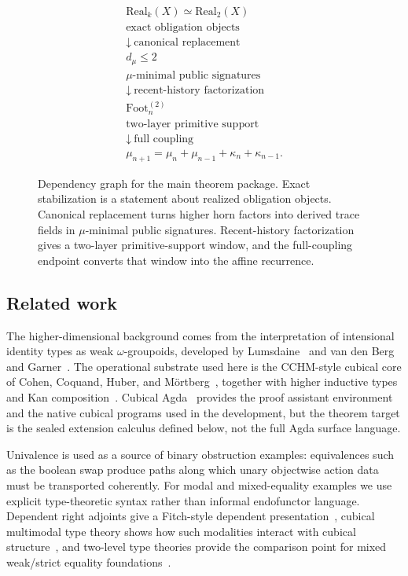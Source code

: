 \documentclass{lmcs}
\newcommand{\Real}{\mathrm{Real}}
\newcommand{\Foot}{\mathrm{Foot}}
\begin{document}
\begin{figure}[t]
\centering
\[
\begin{array}{c}
\Real_k(X)\simeq\Real_2(X)
\\
\text{exact obligation objects}
\\[0.8ex]
\downarrow\ \text{canonical replacement}
\\[0.8ex]
d_\mu\leq 2
\\
\mu\text{-minimal public signatures}
\\[0.8ex]
\downarrow\ \text{recent-history factorization}
\\[0.8ex]
\Foot_n^{(2)}
\\
\text{two-layer primitive support}
\\[0.8ex]
\downarrow\ \text{full coupling}
\\[0.8ex]
\mu_{n+1}=\mu_n+\mu_{n-1}+\kappa_n+\kappa_{n-1}.
\end{array}
\]
\caption{Dependency graph for the main theorem package. Exact stabilization is a statement about realized obligation objects. Canonical replacement turns higher horn factors into derived trace fields in $\mu$-minimal public signatures. Recent-history factorization gives a two-layer primitive-support window, and the full-coupling endpoint converts that window into the affine recurrence.}
\label{fig:dependency-graph}
\end{figure}

\subsection{Related work}
\label{sec:related}

The higher-dimensional background comes from the interpretation of intensional
identity types as weak $\omega$-groupoids, developed by Lumsdaine~\cite{lumsdaine}
and van den Berg and Garner~\cite{vdberg-garner}. The operational substrate used
here is the CCHM-style cubical core of Cohen, Coquand, Huber, and
M\"ortberg~\cite{cubical}, together with higher inductive types and Kan
composition~\cite{cchm-hits}. Cubical Agda~\cite{cubical-agda} provides the proof
assistant environment and the native cubical programs used in the development,
but the theorem target is the sealed extension calculus defined below, not the
full Agda surface language.

Univalence is used as a source of binary obstruction examples: equivalences such
as the boolean swap produce paths along which unary objectwise action data must
be transported coherently. For modal and mixed-equality examples we use explicit
type-theoretic syntax rather than informal endofunctor language. Dependent right
adjoints give a Fitch-style dependent presentation~\cite{birkedal-modal-dtt},
cubical multimodal type theory shows how such modalities interact with cubical
structure~\cite{aagaard-cubical-mtt}, and two-level type theories provide the
comparison point for mixed weak/strict equality foundations~\cite{altenkirch-strict,annenkov-2ltt}.
\end{document}
